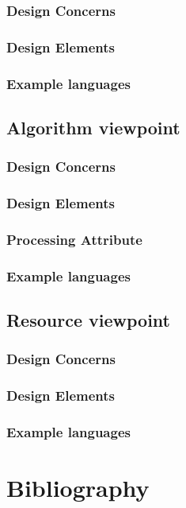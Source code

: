 \documentclass[onecolumn, draftclsnofoot,10pt, compsoc]{IEEEtran}
\begin{document}
\begin{singlespace}
		\subsubsection{Design Concerns}
		\subsubsection{Design Elements}
		\subsubsection{Example languages}
	\subsection{Algorithm viewpoint}
		\subsubsection{Design Concerns}
		\subsubsection{Design Elements}
		\subsubsection{Processing Attribute}
		\subsubsection{Example languages}
	\subsection{Resource viewpoint}
		\subsubsection{Design Concerns}
		\subsubsection{Design Elements}
		\subsubsection{Example languages}

\section{Bibliography}
	
	

\end{singlespace}
\end{document}
